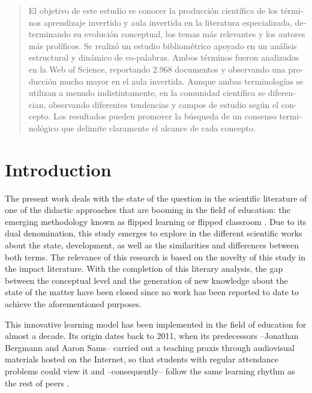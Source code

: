 \documentclass{textolivre-html}
\begin{document}
\begin{polyabstract}
\begin{spanish}
\begin{abstract}
El objetivo de este estudio es conocer la producción científica de los términos aprendizaje invertido y aula invertida en la literatura especializada, determinando su evolución conceptual, los temas más relevantes y los autores más prolíficos. Se realizó un estudio bibliométrico apoyado en un análisis estructural y dinámico de co-palabras. Ambos términos fueron analizados en la Web of Science, reportando 2.968 documentos y observando una producción mucho mayor en el aula invertida. Aunque ambas terminologías se utilizan a menudo indistintamente, en la comunidad científica se diferencian, observando diferentes tendencias y campos de estudio según el concepto. Los resultados pueden promover la búsqueda de un consenso terminológico que delimite claramente el alcance de cada concepto.

\end{abstract}
\end{spanish}

\end{polyabstract}


\section{Introduction}\label{sec-intro}
The present work deals with the state of the question in the scientific literature of one of the didactic approaches that are booming in the field of education: the emerging methodology known as flipped learning or flipped classroom \cite{cabi2018,chen_findings_2019,zainuddin_how_2019}. Due to its dual denomination, this study emerges to explore in the different scientific works about the state, development, as well as the similarities and differences between both terms. The relevance of this research is based on the novelty of this study in the impact literature. With the completion of this literary analysis, the gap between the conceptual level and the generation of new knowledge about the state of the matter have been closed since no work has been reported to date to achieve the aforementioned purposes. 

This innovative learning model has been implemented in the field of education for almost a decade. Its origin dates back to 2011, when its predecessors –Jonathan Bergmann and Aaron Sams– carried out a teaching praxis through audiovisual materials hosted on the Internet, so that students with regular attendance problems could view it and –consequently– follow the same learning rhythm as the rest of peers \cite{bergmann_flip_2012}. 
\end{document}
